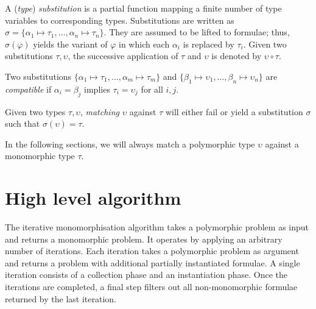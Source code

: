 \documentclass[]{ceurart}
\begin{document}
\begin{definition}
A (\emph{type}) \emph{substitution} is a partial function mapping a finite number of type variables to corresponding types. Substitutions are written as
$\sigma = \{\alpha_1\mapsto\tau_1, \dots, \alpha_n\mapsto\tau_n\}$. They are assumed to be lifted to formulae; thus, $\sigma(\varphi)$ yields the variant of $\varphi$ in which each $\alpha_i$ is replaced by $\tau_i$.
Given two substitutions \(\tau, \upsilon\), the successive application of \(\tau\) and \(\upsilon\) is denoted by \(\upsilon \circ \tau\).
\end{definition}

\begin{definition}
Two substitutions \(\{\alpha_1 \mapsto \tau_1, \dots, \alpha_m\mapsto\tau_m\}\) and \(\{\beta_1 \mapsto \upsilon_1, \dots, \beta_n\mapsto\upsilon_n\}\) are \emph{compatible} if \(\alpha_i = \beta_j\) implies \(\tau_i = \upsilon_j\) for all \(i, j\).
\end{definition}


\begin{definition}
Given two types \(\tau, \upsilon\), \emph{matching} \(\upsilon\) against \(\tau\) will either fail or yield a substitution \(\sigma\) such that \(\sigma(\upsilon) = \tau\).
\end{definition}

In the following sections, we will always match a polymorphic type $\upsilon$ against a monomorphic type $\tau$.

\section{High level algorithm}
\label{sec:high level-algorithm}

The iterative monomorphisation algorithm takes a polymorphic problem as input and returns a monomorphic problem. It operates by applying an arbitrary number of iterations. Each iteration takes a polymorphic problem as argument and returns a problem with additional partially instantiated formulae. A single iteration consists of a collection phase and an instantiation phase. Once the iterations are completed, a final step filters out all non-monomorphic formulae returned by the last iteration.
\end{document}
